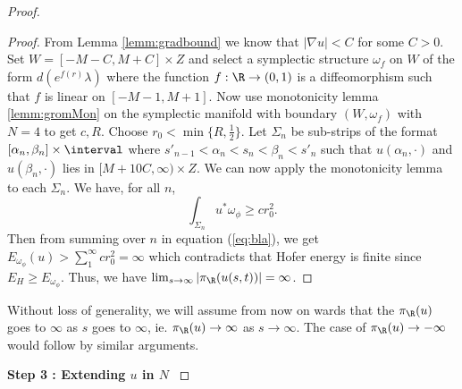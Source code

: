 \begin{proof}
\begin{proof}
From Lemma \ref{lemm:gradbound} we know that $|\nabla u | < C$ for some $C > 0$.
Set $W=[-M-C,M+C] \times Z$ and select a symplectic structure $\omega_f$ on $W$  of the form $d(e^{f(r)}\lambda)$ where the function $f:\R \to (0,1)$ is a diffeomorphism such that $f$ is linear on $[-M-1,M+1]$. Now use  monotonicity lemma \ref{lemm:gromMon} on the symplectic manifold with boundary $(W,\omega_f)$ with $N=4$ to get $c,R$. Choose $r_0 < \min \{ R,\frac{1}{2}\}$. Let $\Sigma_n  $ be sub-strips of the format $[\alpha_n,\beta_n] \times \interval$ where $s'_{n-1}<\alpha_n < s_n < \beta_n < s'_n$ such that $u(\alpha_n, \cdot)$ and $u(\beta_n, \cdot)$ lies in $[M+ 10C , \infty) \times Z$.  We can now apply the monotonicity lemma to each $\Sigma_n$. We have, for all $n$, \begin{equation}\label{eq:bla}
    \int_{\Sigma_n} u^*\omega_\phi \geq {c}{r_0^2}.
\end{equation} 
Then from summing over $n$ in equation (\ref{eq:bla}), we get $E_{\omega_{\phi}}(u) > \sum_1^\infty {c}{r_0^2}=\infty$ which contradicts that Hofer energy is finite since $E_H \geq E_{\omega_{\phi}}$. Thus, we have $\lim_{s\to \infty} |\pi_\R (u(s,t)) | = \infty$.



\end{proof}

\noindent Without loss of generality, we will assume from now on wards that the $\pi_\R(u)$ goes to $\infty$ as $s$ goes to $\infty$, ie. $\pi_\R (u) \to \infty $ as $s \to \infty$. The case of $\pi_\R(u) \to -\infty$ would follow by similar arguments.

\textbf{Step 3 : Extending $u$ in $N$} \label{comptarg} 


\end{proof}
